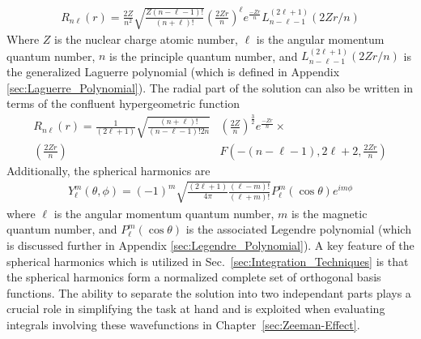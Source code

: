         \begin{align}
            R_{n\ell}(r) = \frac{2Z}{n^2} \sqrt{\frac{Z(n - \ell - 1)!}{(n + \ell)!}} \left( \frac{2Zr}{n} \right)^\ell e^{\frac{-Zr}{n}} L_{n - \ell - 1}^{(2\ell + 1)} \left( 2Zr/n \right) \label{eq:radial_equation}
        \end{align}
       \noindent Where $Z$ is the nuclear charge atomic number, $\ell$ is the angular momentum quantum number, $n$ is the principle quantum number, and $L_{n - \ell - 1}^{(2\ell + 1)} (2Zr/n)$ is the generalized Laguerre polynomial (which is defined in Appendix \ref{sec:Laguerre_Polynomial}). The radial part of the solution can also be written in terms of the confluent hypergeometric function \cite{Bethe_Salpeter_1977}
        \begin{align}
            R_{n\ell}(r) = \frac{1}{(2\ell + 1)} \sqrt{\frac{(n+\ell)!}{(n - \ell - 1)! 2n}}& \left( \frac{2Z}{n} \right)^{\frac{3}{2}} e^{\frac{-Zr}{n}} \times \\
            \left(\frac{2Zr}{n} \right) &F\left(-(n - \ell - 1), 2\ell + 2, \frac{2Zr}{n}\right) \nonumber
        \end{align}
       \noindent Additionally, the spherical harmonics are
        \begin{align}
            Y^m_\ell (\theta, \phi) = (-1)^m \sqrt{\frac{(2\ell + 1)}{4 \pi}\frac{(\ell - m)!}{(\ell + m)!}} P_\ell^m (\cos \theta) e^{i m \phi} \label{eq:angular_equation}
        \end{align}
        \noindent where $\ell$ is the angular momentum quantum number, $m$ is the magnetic quantum number, and $P_\ell^m (\cos \theta)$ is the associated Legendre polynomial (which is discussed further in Appendix \ref{sec:Legendre_Polynomial}). A key feature of the spherical harmonics which is utilized in Sec.~\ref{sec:Integration_Techniques} is that the spherical harmonics form a normalized complete set of orthogonal basis functions. The ability to separate the solution into two independant parts plays a crucial role in simplifying the task at hand and is exploited when evaluating integrals involving these wavefunctions in Chapter~\ref{sec:Zeeman-Effect}.

